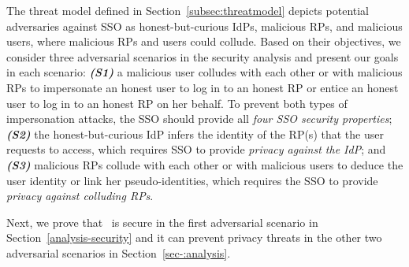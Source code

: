 
\newc
The threat model defined in Section~\ref{subsec:threatmodel} depicts potential adversaries against SSO as honest-but-curious IdPs, malicious RPs, and malicious users, where malicious RPs and users could collude. Based on their objectives, we consider three adversarial scenarios in the security analysis and present our goals in each scenario: {\bf \emph{(S1)}} a malicious user colludes with each other or with malicious RPs to impersonate an honest user to log in to an honest RP or entice an honest user to log in to an honest RP on her behalf. To prevent both types of impersonation attacks, the SSO should provide all {\em four SSO security properties}; {\bf \emph{(S2)}} the honest-but-curious IdP infers the identity of the RP(s) that the user requests to access, which requires SSO to provide {\em privacy against the IdP}; and {\bf \emph{(S3)}} malicious RPs collude with each other or with malicious users to deduce the user identity or link her pseudo-identities, which requires the SSO to provide {\em privacy against colluding RPs}.

Next, we prove that \usso~is secure in the first adversarial scenario in Section~\ref{analysis-security} and it can prevent privacy threats in the other two adversarial scenarios in Section~\ref{sec-:analysis}.
\oldc

